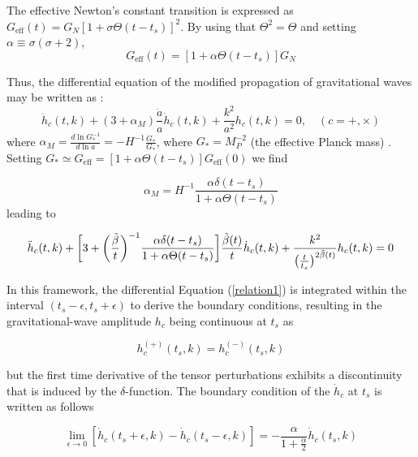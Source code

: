 \documentclass[universe,article,accept,moreauthors,pdftex]{Definitions/mdpi}
\begin{document}
The effective Newton's constant transition is expressed as $G_{\text{eff}}(t)= G_{N} [1+\sigma \Theta(t-t_{s})]^2$. By using that $\Theta^2=\Theta$ and setting  $\alpha\equiv \sigma(\sigma+2)$, 
\begin{equation}
    G_{\text{eff}}(t)=[1+\alpha \Theta(t-t_{s})]G_{N}
\end{equation}


 Thus, the differential equation of the modified propagation of gravitational waves may be written as
\cite{Saltas:2014dha,Pettorino:2014bka}: 
\begin{equation}\label{eq10a}
  \ddot{h}_{c}(t,k)+ (3+\alpha_{M}) \frac{\dot{a}}{a}\dot{h}_{c}(t,k)+\frac{k^{2}}{a^{2}}h_{c}(t,k)=0, \quad (c=+,\times)
\end{equation}
where $\alpha_{M}=\frac{d \ln G^{-1}_{*}}{d\ln a}=-H^{-1}\frac{\dot{G}_{*}}{G_{\ast}}$, where $G_{*}=M^{-2}_{P}$ (the effective Planck mass) \cite{Gleyzes:2014rba,Belgacem_2019}. Setting $G_*\simeq G_{\text{eff}}=[1+\alpha \Theta(t-t_{s})]G_{\text{eff}}(0)$ we find

\begin{equation}\label{at}
    \alpha_{M}=H^{-1}\frac{\alpha \delta(t-t_{s})}{1+\alpha \Theta(t-t_{s})}
\end{equation}
leading to

\begin{equation}\label{relation1}
   \ddot{h}_{c}(t,k)+  \bigg{[}3+\bigg{(}\frac{\tilde{\beta}}{t}\bigg{)}^{-1}\frac{\alpha \delta(t-t_{s})}{1+\alpha \Theta(t-t_{s})}\bigg{]} \frac{\tilde{\beta}(t)}{t}\dot{h}_{c}(t,k)+\frac{k^{2}}{\big{(}\frac{t}{t_{s}}\big{)}^{2\tilde{\beta}(t)}}h_{c}(t,k)=0
\end{equation}

In this framework, the differential Equation (\ref{relation1}) is integrated within the interval $(t_{s}-\epsilon,t_{s}+\epsilon)$ to derive the boundary conditions, resulting in the gravitational-wave amplitude $h_{c}$ being continuous at $t_{s}$ as

\begin{equation} \label{boundary1}
h^{(+)}_{c}(t_{s},k)=h^{(-)}_{c}(t_{s},k) 
\end{equation}

but the first time derivative of the tensor perturbations exhibits a discontinuity that is induced by the $\delta$-function. The boundary condition of the $\dot{h}_{c}$ at $t_{s}$ is written as follows

\begin{equation}\label{boundary2}
    \lim_{\epsilon\to 0}[\dot{h}_{c}(t_{s}+\epsilon,k)-\dot{h}_{c}(t_{s}-\epsilon,k)]= -   \frac{\alpha}{1+\frac{\alpha}{2}}\dot{h}_{c}(t_{s},k)
\end{equation}
\end{document}
